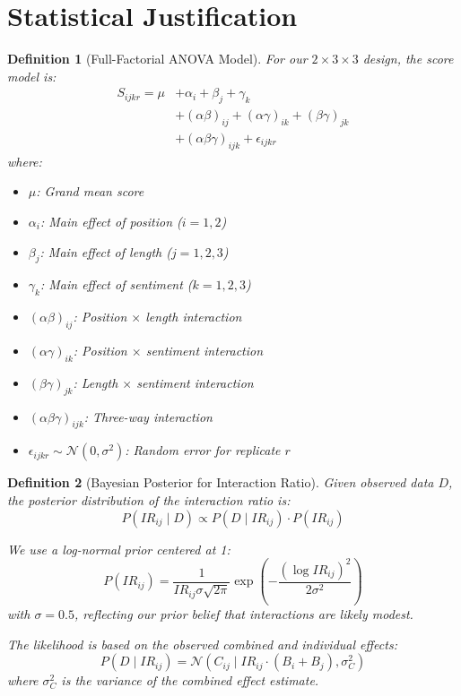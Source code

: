 \documentclass[11pt]{article}
\newtheorem{definition}{Definition}
\begin{document}
\section{Statistical Justification}

\begin{definition}[Full-Factorial ANOVA Model]
For our $2 \times 3 \times 3$ design, the score model is:
\begin{align}
S_{ijkr} = \mu &+ \alpha_i + \beta_j + \gamma_k \\
&+ (\alpha\beta)_{ij} + (\alpha\gamma)_{ik} + (\beta\gamma)_{jk} \\
&+ (\alpha\beta\gamma)_{ijk} + \epsilon_{ijkr}
\end{align}
where:
\begin{itemize}
    \item $\mu$: Grand mean score
    \item $\alpha_i$: Main effect of position ($i = 1,2$)
    \item $\beta_j$: Main effect of length ($j = 1,2,3$)
    \item $\gamma_k$: Main effect of sentiment ($k = 1,2,3$)
    \item $(\alpha\beta)_{ij}$: Position $\times$ length interaction
    \item $(\alpha\gamma)_{ik}$: Position $\times$ sentiment interaction
    \item $(\beta\gamma)_{jk}$: Length $\times$ sentiment interaction
    \item $(\alpha\beta\gamma)_{ijk}$: Three-way interaction
    \item $\epsilon_{ijkr} \sim \mathcal{N}(0, \sigma^2)$: Random error for replicate $r$
\end{itemize}
\end{definition}

\begin{definition}[Bayesian Posterior for Interaction Ratio]
Given observed data $D$, the posterior distribution of the interaction ratio is:
\begin{equation}
P(IR_{ij} \mid D) \propto P(D \mid IR_{ij}) \cdot P(IR_{ij})
\end{equation}

We use a log-normal prior centered at 1:
\begin{equation}
P(IR_{ij}) = \frac{1}{IR_{ij} \sigma \sqrt{2\pi}} \exp\left(-\frac{(\log IR_{ij})^2}{2\sigma^2}\right)
\end{equation}
with $\sigma = 0.5$, reflecting our prior belief that interactions are likely modest.

The likelihood is based on the observed combined and individual effects:
\begin{equation}
P(D \mid IR_{ij}) = \mathcal{N}(C_{ij} \mid IR_{ij} \cdot (B_i + B_j), \sigma_C^2)
\end{equation}
where $\sigma_C^2$ is the variance of the combined effect estimate.
\end{definition}
\end{document}
